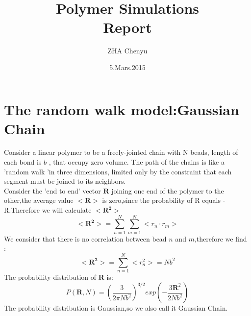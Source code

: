 \documentclass{article}
\title{\LARGE{Polymer Simulations}\\ \large{Report}
}
\author{ZHA Chenyu}
\date{5.Mars.2015}
\begin{document}
\maketitle
\pagebreak


\section{The random walk model:Gaussian Chain}
\paragraph{}

Consider a linear polymer to be a freely-jointed chain with N beads, length of each bond is $b$ , that occupy zero volume. The path of the chains is like a 'random walk 'in three dimensions, limited only by the constraint that each segment must be joined to its neighbors.\\

Consider the 'end to end' vector $\bm{R}$ joining one end of the polymer to the other,the average value $<\bm{R}>$ is zero,since the probability of R equals -R.Therefore we will calculate $<\bm{R^2}>$
\begin{equation}
<\bm{R^2}>=\sum_{{n=1}}^{N}\sum_{m=1}^{N}<r_n\cdot r_m>
\end{equation} 
We consider that there is no correlation between bead $n$ and $m$,therefore we find :
\begin{equation}
<\bm{R^2}>=\sum_{{n=1}}^{N}<r_n^2>=Nb^2
\end{equation}
The probability distribution of $\bm{R}$ is:
\begin{equation}
P(\bm{R},N)=(\frac{3}{2\pi Nb^2})^{3/2}exp(-\frac{3\bm{R}^2}{2Nb^2})
\end{equation}
The probability distribution is Gaussian,so we also call it Gaussian Chain.
\end{document}
